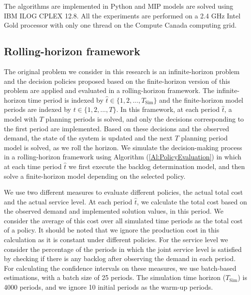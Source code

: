 \documentclass[11pt]{article}
\newcommand{\ti}{t} %
\newcommand{\Ti}{T}
\newcommand{\ka}{k} %
\newcommand{\Bi}{B} %
\newcommand{\Vi}{v} %
\newcommand{\tAct}{\hat{\ti}} %
\newcommand{\cred}{\color{black}}
\begin{document}
The algorithms are implemented in Python and MIP models are solved using IBM ILOG CPLEX 12.8. All the experiments are performed on a 2.4 GHz Intel Gold processor with only one thread on the Compute Canada computing grid.











\subsection{Rolling-horizon framework}
\label{Sec:Rolling}

The original problem we consider in this research is an infinite-horizon problem and the decision policies proposed based on the finite-horizon version of this problem are applied and evaluated in a rolling-horizon framework. The infinite-horizon time period is indexed by $\tAct \in \{1, 2, ... , \Ti_\text{Sim}\}$ and the finite-horizon model periods are indexed by $\ti \in \{1, 2, ... , \Ti\}$. In this framework, at each period $\tAct$, a model with $\Ti$ planning periods is solved, and only the decisions corresponding to the first period are implemented. Based on these decisions and the observed demand, the state of the system is updated and the next $\Ti$ planning period model is solved, as we roll the horizon. 
We simulate the decision-making process in a rolling-horizon framework using Algorithm (\ref{Al:PolicyEvaluation}) in which at each time period $\tAct$ we first execute the backlog determination model, and then solve a finite-horizon model  depending on the  selected policy. 

We use two different measures to evaluate different policies, the actual total cost and the actual service level. At each period $\tAct$, we calculate the total cost based on the observed demand and implemented solution values, in this period. We consider the average of this cost over all simulated time periods as the total cost of a policy. {\cred It should be noted that we ignore the production cost in this calculation as it is constant under different policies.} For the service level we consider the percentage of the periods in which the joint service level is satisfied by checking if there is any backlog after observing the demand in each period. For calculating the confidence intervals on these measures, we use batch-based estimations, with a batch size of 25 periods. 
The simulation time horizon ($\Ti_\text{Sim}$) is 4000 periods, and we ignore 10 initial periods as the warm-up periods.
\end{document}
